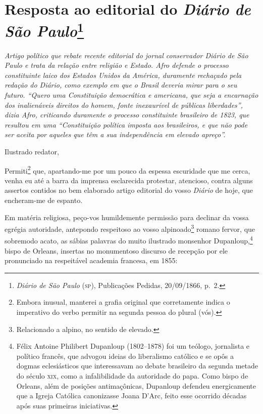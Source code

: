\chapter{Resposta ao editorial do \emph{Diário de São Paulo}\footnote{
  \emph{Diário de São Paulo} (\textsc{sp}), Publicações Pedidas, 20/09/1866,
  p.~2.}}

\begin{didascalia}\itshape
Artigo político que rebate recente editorial do jornal conservador \textnormal{
Diário de São Paulo} e trata da relação entre religião e Estado. Afro
defende o processo constituinte laico dos Estados Unidos da
América, duramente rechaçado pela redação do \textnormal{Diário}, como exemplo
em que o Brasil deveria mirar para o seu futuro. ``Quero uma Constituição
democrática e americana, que seja a encarnação dos inalienáveis direitos
do homem, fonte inexaurível de públicas liberdades'', dizia Afro,
criticando duramente o processo constituinte brasileiro de 1823, que
resultou em uma ``Constituição política imposta aos brasileiros, e que não
pode ser aceita por aqueles que têm a sua independência em elevado
apreço''.
\end{didascalia}



Ilustrado redator,

Permiti\footnote{Embora inusual, manterei a grafia original que
  corretamente indica o imperativo do verbo permitir na segunda pessoa
  do plural (vós).} que, apartando-me por um pouco da espessa escuridade
que me cerca, venha eu até a barra da imprensa esclarecida protestar,
atencioso, contra alguns assertos contidos no bem elaborado artigo
editorial do vosso \emph{Diário} de hoje, que encheram-me de espanto.

Em matéria religiosa, peço-vos humildemente permissão para declinar da
vossa egrégia autoridade, antepondo respeitoso ao vosso
alpinoado\footnote{Relacionado a alpino, no sentido de elevado.}
romano fervor, que sobremodo acato, as sábias palavras do muito
ilustrado monsenhor Dupanloup,\footnote{Félix Antoine Philibert
  Dupanloup (1802--1878) foi um teólogo, jornalista e político francês,
  que advogou ideias do liberalismo católico e se opôs a dogmas
  eclesiásticos que interessavam ao debate brasileiro da segunda metade
  do século \textsc{xix}, como a infalibilidade da autoridade do papa. Como bispo
  de Orleans, além de posições antimaçônicas, Dupanloup defendeu
  energicamente que a Igreja Católica canonizasse Joana D'Arc, feito
  esse ocorrido décadas após suas primeiras iniciativas.} bispo de
Orleans, insertas no monumentoso discurso de recepção por ele
pronunciado na respeitável academia francesa, em 1855:


